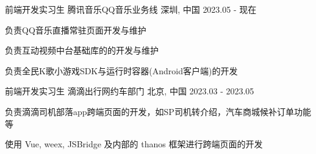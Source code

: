 

\begin{cventries}
    \cventry
    {前端开发实习生} %
    {腾讯音乐\hspace{2mm}QQ音乐业务线} %
    {深圳, 中国} %
    {2023.05 - 现在} %
    {
        \begin{cvitems} %
            \item {负责QQ音乐直播常驻页面开发与维护}
            \item {负责互动视频中台基础库的的开发与维护}
            \item {负责全民K歌小游戏SDK与运行时容器(Android客户端)的开发}
        \end{cvitems}
    }

    \cventry
    {前端开发实习生} %
    {滴滴出行\hspace{2mm}网约车部门} %
    {北京, 中国} %
    {2023.03 - 2023.05} %
    {
        \begin{cvitems} %
            \item {负责滴滴司机部落app跨端页面的开发，如SP司机转介绍，汽车商城候补订单功能等}
            \item {使用 Vue, weex, JSBridge 及内部的 thanos 框架进行跨端页面的开发}
        \end{cvitems}
    }
\end{cventries}
